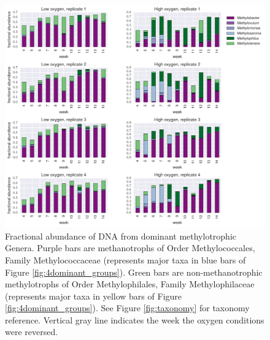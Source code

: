 \begin{figure}[H]
\centering
    \includegraphics[width=1.0\textwidth]{./tex/chapter2/figures/170313_methanotroph_methylotroph_taxa--portrait.pdf}  %
    \begin{singlespace}
    \caption[Dominant methanotrophic and methylotrophic Genera.]{
        Fractional abundance of DNA from dominant methylotrophic Genera.
        Purple bars are methanotrophs of Order Methylococcales, Family Methylococcaceae
            (represents major taxa in blue bars of Figure \ref{fig:4dominant_groups}).
        Green bars are non-methanotrophic methylotrophs of Order Methylophilales, Family Methylophilaceae
            (represents major taxa in yellow bars of Figure \ref{fig:4dominant_groups}).
        See Figure \ref{fig:taxonomy} for taxonomy reference.
        Vertical gray line indicates the week the oxygen conditions were reversed.
        }
    \label{fig:dominant_genera}
    \end{singlespace}
\end{figure}


